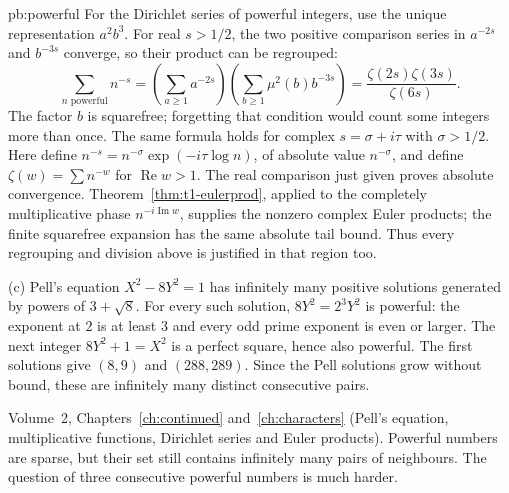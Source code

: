 \begin{solution}{pb:powerful}
For the Dirichlet series of powerful integers, use the unique representation $a^2b^3$. For real $s>1/2$, the two positive comparison series in $a^{-2s}$ and $b^{-3s}$ converge, so their product can be regrouped:
\[
\sum_{n\text{ powerful}}n^{-s}
=\left(\sum_{a\ge1}a^{-2s}\right)
 \left(\sum_{b\ge1}\mu^2(b)b^{-3s}\right)
=\frac{\zeta(2s)\zeta(3s)}{\zeta(6s)}.
\]
The factor $b$ is squarefree; forgetting that condition would count some integers more than once.
The same formula holds for complex $s=\sigma+i\tau$ with $\sigma>1/2$. Here define $n^{-s}=n^{-\sigma}\exp(-i\tau\log n)$, of absolute value $n^{-\sigma}$, and define $\zeta(w)=\sum n^{-w}$ for $\operatorname{Re}w>1$. The real comparison just given proves absolute convergence. Theorem~\ref{thm:t1-eulerprod}, applied to the completely multiplicative phase $n^{-i\operatorname{Im}w}$, supplies the nonzero complex Euler products; the finite squarefree expansion has the same absolute tail bound. Thus every regrouping and division above is justified in that region too.

(c) Pell's equation $X^2-8Y^2=1$ has infinitely many positive solutions generated by powers of $3+\sqrt8$. For every such solution, $8Y^2=2^3Y^2$ is powerful: the exponent at $2$ is at least $3$ and every odd prime exponent is even or larger. The next integer $8Y^2+1=X^2$ is a perfect square, hence also powerful. The first solutions give $(8,9)$ and $(288,289)$. Since the Pell solutions grow without bound, these are infinitely many distinct consecutive pairs.

\tools Volume~2, Chapters~\ref{ch:continued} and~\ref{ch:characters} (Pell's equation, multiplicative functions, Dirichlet series and Euler products).
\leads Powerful numbers are sparse, but their set still contains infinitely many pairs of neighbours. The question of three consecutive powerful numbers is much harder.
\end{solution}

